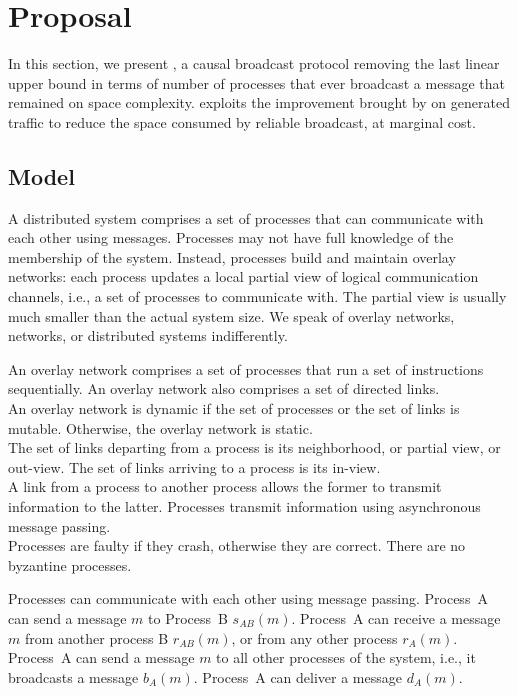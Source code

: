 
\section{Proposal}
\label{sec:proposal}

In this section, we present \RPCBROADCAST, a causal broadcast protocol removing
the last linear upper bound in terms of number of processes that ever broadcast
a message that remained on space complexity. \RPCBROADCAST exploits the
improvement brought by \PCBROADCAST on generated traffic to reduce the space
consumed by reliable broadcast, at marginal cost.

\subsection{Model}

A distributed system comprises a set of processes that can communicate with each
other using messages. Processes may not have full knowledge of the membership of
the system. Instead, processes build and maintain overlay networks: each process
updates a local partial view of logical communication channels, i.e., a set of
processes to communicate with. The partial view is usually much smaller than the
actual system size. We speak of overlay networks, networks, or distributed
systems indifferently.

\begin{definition}
  An overlay network comprises a set of processes that run a set of instructions
  sequentially.  An overlay network also comprises a set of directed
  links. \\
  An overlay network is dynamic if the set of processes or the set of links is
  mutable. Otherwise, the overlay network is static. \\
  The set of links departing from a process is its neighborhood, or partial
  view, or out-view. The set of links arriving to a process is its in-view. \\
  A link from a process to another process allows the former to transmit
  information to the latter. Processes transmit information using asynchronous
  message passing.\\
  Processes are faulty if they crash, otherwise they are correct. There are no
  byzantine processes.
\end{definition}

Processes can communicate with each other using message passing. Process~A can
send a message $m$ to Process~B $s_{AB}(m)$. Process~A can receive a message $m$
from another process B $r_{AB}(m)$, or from any other process
$r_A(m)$. Process~A can send a message $m$ to all other processes of the system,
i.e., it broadcasts a message $b_A(m)$. Process~A can deliver a message
$d_A(m)$.


